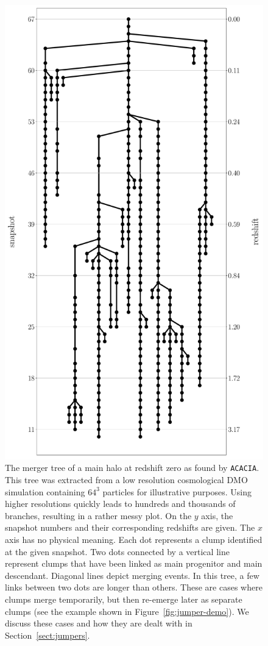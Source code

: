 \begin{figure}
	\centering
  \includegraphics[height=.8\textheight]{figures/ACACIA/merger_tree_example.pdf}%
  \caption{The merger tree of a main halo at redshift zero as found by
    \texttt{ACACIA}.  This tree was extracted from a low resolution
    cosmological DMO simulation containing $64^3$ particles for
    illustrative purposes. Using higher resolutions quickly leads to
    hundreds and thousands of branches, resulting in a rather messy
    plot. On the $y$ axis, the snapshot numbers and their
    corresponding redshifts are given.  The $x$ axis has no physical
    meaning.  Each dot represents a clump identified at the given
    snapshot.  Two dots connected by a vertical line represent clumps
    that have been linked as main progenitor and main descendant.
    Diagonal lines depict merging events. In this tree, a few links
    between two dots are longer than others.  These are cases where
    clumps merge temporarily, but then re-emerge later as separate
    clumps (see the example shown in Figure~\ref{fig:jumper-demo}).
    We discuss these cases and how they are dealt with in
    Section~\ref{sect:jumpers}. }
  \label{fig:mergertree}
\end{figure}

